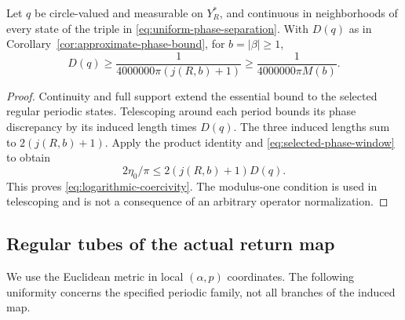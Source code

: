 \begin{corollary}
\label{cor:logarithmic-coercivity}
Let $q$ be circle-valued and measurable on $Y_R^*$, and continuous
in neighborhoods of every state of the triple in
\eqref{eq:uniform-phase-separation}. With $D(q)$ as in
Corollary~\ref{cor:approximate-phase-bound}, for $b=|\beta|\ge1$,
\begin{equation}\label{eq:logarithmic-coercivity}
 D(q)\ge\frac1{4000000\pi(j(R,b)+1)}
       \ge\frac1{4000000\pi M(b)}.
\end{equation}
\end{corollary}
\begin{proof}
Continuity and full support extend the essential bound to the
selected regular periodic states. Telescoping around each period
bounds its phase discrepancy by its induced length times $D(q)$.
The three induced lengths sum to $2(j(R,b)+1)$. Apply the product
identity and \eqref{eq:selected-phase-window} to obtain
\[
 2\eta_0/\pi\le2(j(R,b)+1)D(q).
\]
This proves \eqref{eq:logarithmic-coercivity}. The modulus-one
condition is used in telescoping and is not a consequence of an
arbitrary operator normalization.
\end{proof}

\subsection{Regular tubes of the actual return map}
We use the Euclidean metric in local $(\alpha,p)$ coordinates. The
following uniformity concerns the specified periodic family, not all
branches of the induced map.

